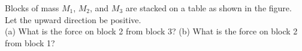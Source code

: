 Blocks of mass $M_1$, $M_2$, and $M_3$ are stacked on a table as shown in the figure. Let the
upward direction be positive.\\
%
(a) What is the force on block 2 from block 3?\hwendpart
%
(b) What is the force on block 2 from block 1?
